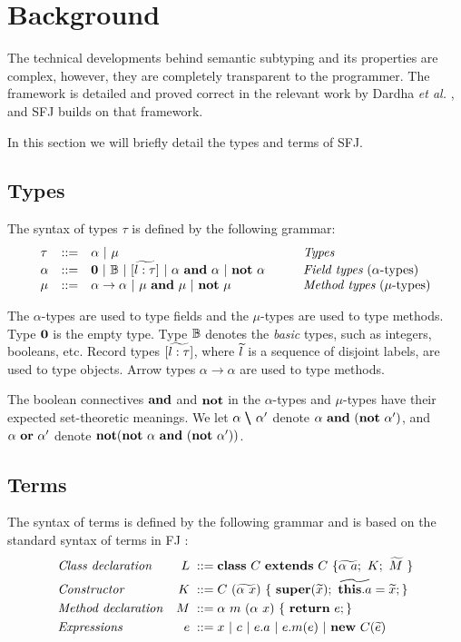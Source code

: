 \section{Background}
\label{sec:background}
The technical developments behind semantic subtyping and its properties are complex, however, they are completely transparent to the programmer. The framework is detailed and proved correct in the relevant work by Dardha \emph{et al.} \cite{Dardha2013,Dardha2017}, and SFJ builds on that framework.

In this section we will briefly detail the types and terms of SFJ.

\subsection{Types}
The syntax of types $\tau$ is defined by the following grammar:
$$
\begin{array}{llll}
\tau & ::= & \alpha \ |\ \mu
& \mbox{{\em Types}}
\\
\alpha & ::=  & \zero \ |\ \btypes \ |\ [\wt{l:\tau}] \ |\ \alpha\ \synwedge\ \alpha \ |\ \synneg\ \alpha
\qquad
& \mbox{{\em Field types} ($\alpha $-types)}
\\
\mu & ::=  & \alpha \to \alpha \ |\ \mu\ \synwedge\ \mu \ |\ \synneg\ \mu
& \mbox{{\em Method types} ($\mu $-types)}
\end{array}
$$

The $\alpha$-types are used to type fields and the $\mu$-types are used to type methods.
Type $\mathbf{0}$ is the empty type.
Type ${\mathbb B}$ denotes the \emph{basic} types, such as integers, booleans, etc.
{Record} types $[\widetilde{l:\tau}]$, where $\widetilde{l}$ is a sequence of disjoint labels, are used to type objects.
Arrow types $\alpha \to \alpha$ are used to type methods.

The boolean connectives $\bf{and}$ and $\bf{not}$ in the $\alpha$-types and $\mu$-types have their expected set-theoretic meanings.
We let $\alpha\ \pmb{\backslash}\ \alpha'$  denote $\alpha\ \mathbf{and}\ (\mathbf{not}\ \alpha')$, and $\alpha\ \mathbf{or}\ \alpha'$  denote $\synneg(\synneg\ \alpha\ \synwedge\ (\synneg\ \alpha'))$.

\subsection{Terms}
The syntax of terms is defined by the following grammar and is based on the standard syntax of terms in FJ \cite{featherweight}:
\begin{align*}
     & \mbox{\textit{Class declaration}}  & L \; ::= \; & \syndecl{C}{C}{\wt{\alpha \ a};\ K; \ \wt{M}\ }                         \\
     & \mbox{\textit{Constructor}}        & K \;::=\;   & C\ (\wt{\alpha\ x})\ \{\ \synsuper(\wt{x});\ \wt{\synthis.a}=\wt{x}; \} \\
     & \mbox{\textit{Method declaration}} & M \; ::= \; & \alpha \ m\ (\alpha \ x)\ \{\ \synret e; \}                             \\
     & \mbox{\textit{Expressions}}        & e \; ::=\;  & x\ |\  c\ |\ e.a\ |\ e.m(e) \ | \ \synnew C(\wt{e})
\end{align*}

